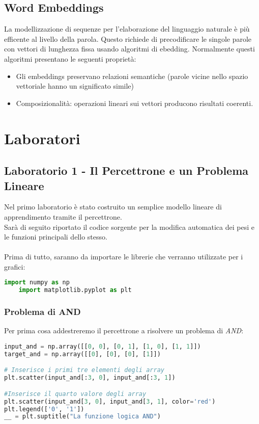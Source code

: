 \documentclass[12pt, a4paper]{article}
\begin{document}
\subsection{Word Embeddings}
La modellizzazione di sequenze per l'elaborazione del linguaggio naturale è più efficente al livello della parola. Questo richiede di precodificare le singole parole con vettori di lunghezza fissa usando algoritmi di ebedding.
Normalmente questi algoritmi presentano le seguenti proprietà:
\begin{itemize}
    \item Gli embeddings preservano relazioni semantiche (parole vicine nello spazio vettoriale hanno un significato simile)
    \item Composizionalità: operazioni lineari sui vettori producono risultati coerenti.
\end{itemize}









\section{Laboratori}
\subsection{Laboratorio 1 - Il Percettrone e un Problema Lineare}
Nel primo laboratorio è stato costruito un semplice modello lineare di apprendimento tramite il percettrone.\\
Sarà di seguito riportato il codice sorgente per la modifica automatica dei pesi e le funzioni principali dello stesso.\\
\\
Prima di tutto, saranno da importare le librerie che verranno utilizzate per i grafici:
\begin{lstlisting}[language=Python, caption=Importazione delle librerie]
    import numpy as np
    import matplotlib.pyplot as plt
\end{lstlisting}

\subsubsection{Problema di AND}
Per prima cosa addestreremo il percettrone a risolvere un problema di \textit{AND}:
\begin{lstlisting}[language=Python, caption=Inizializzazione]
input_and = np.array([[0, 0], [0, 1], [1, 0], [1, 1]])
target_and = np.array([[0], [0], [0], [1]])

# Inserisce i primi tre elementi degli array
plt.scatter(input_and[:3, 0], input_and[:3, 1]) 

#Inserisce il quarto valore degli array
plt.scatter(input_and[3, 0], input_and[3, 1], color='red')
plt.legend(['0', '1'])
__ = plt.suptitle("La funzione logica AND")
\end{lstlisting}
\end{document}
